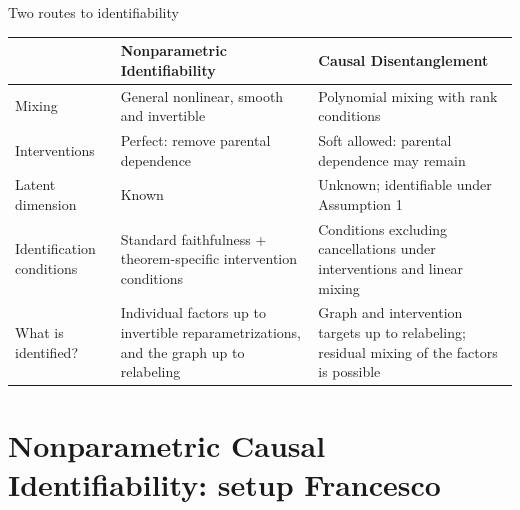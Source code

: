 \documentclass[11pt,aspectratio=169]{beamer}
\begin{document}
\begin{frame}{Two routes to identifiability}
	\begin{center}
		\renewcommand{\arraystretch}{1.2}
		\begin{tabular}{@{}>{\raggedright\arraybackslash}p{}>{\raggedright\arraybackslash}p{}>{\raggedright\arraybackslash}p{}@{}}
			\toprule
			& \textbf{Nonparametric Identifiability} & \textbf{Causal Disentanglement} \\
			\midrule
			Mixing & General nonlinear, smooth and invertible & Polynomial mixing with rank conditions \\[1.5mm]
			Interventions & Perfect: remove parental dependence & Soft allowed: parental dependence may remain \\[1.5mm]
			Latent dimension & Known & Unknown; identifiable under Assumption 1 \\[1.5mm]
			Identification conditions & Standard faithfulness + theorem-specific intervention conditions & Conditions excluding cancellations under interventions and linear mixing \\[1.5mm]
			What is identified? & Individual factors up to invertible reparametrizations, and the graph up to relabeling & Graph and intervention targets up to relabeling; residual mixing of the factors is possible \\
			\bottomrule
		\end{tabular}
	\end{center}
\end{frame}

\section{Nonparametric Causal Identifiability: setup \hfill {\normalsize Francesco}}
\end{document}
